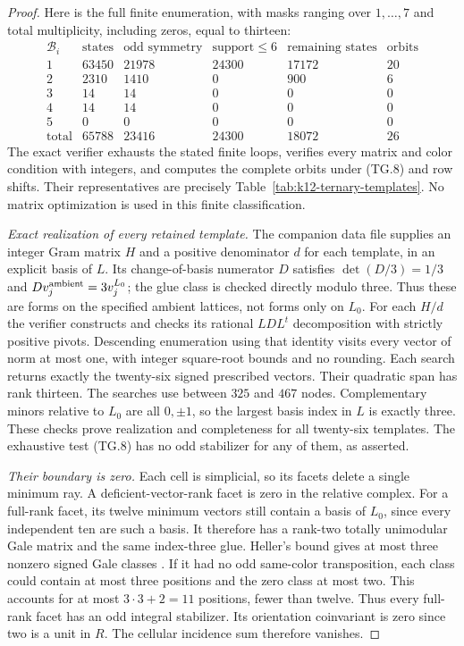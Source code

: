 \begin{proof}
Here is the full finite enumeration, with masks ranging over
$1,\ldots,7$ and total multiplicity, including zeros, equal to thirteen:
\[
\begin{array}{c|r|r|r|r|r}
\mathcal B_i&\text{states}&\text{odd symmetry}&\text{support}\le6
       &\text{remaining states}&\text{orbits}\\\hline
1&63450&21978&24300&17172&20\\
2&2310&1410&0&900&6\\
3&14&14&0&0&0\\
4&14&14&0&0&0\\
5&0&0&0&0&0\\\hline
\text{total}&65788&23416&24300&18072&26
\end{array}                                                     \tag{TG.9}
\]
The exact verifier exhausts the stated finite loops, verifies every
matrix and color condition with integers, and computes the complete
orbits under (TG.8) and row shifts. Their representatives are precisely
Table~\ref{tab:k12-ternary-templates}. No matrix optimization is used
in this finite classification.

\emph{Exact realization of every retained template.}
The companion data file supplies an integer Gram matrix $H$ and a
positive denominator $d$ for each template, in an explicit basis of
$L$. Its change-of-basis numerator $D$ satisfies
$\det(D/3)=1/3$ and $Dv_j^{\rm ambient}=3v_j^{L_0}$; the glue class
is checked directly modulo three. Thus these are forms on the
specified ambient lattices, not forms only on $L_0$.
For each $H/d$ the verifier constructs and checks its rational
$LDL^t$ decomposition with strictly positive pivots. Descending
enumeration using that identity visits every vector of norm at most
one, with integer square-root bounds and no rounding. Each search
returns exactly the twenty-six signed prescribed vectors. Their
quadratic span has rank thirteen. The searches use between $325$
and $467$ nodes. Complementary minors relative to $L_0$ are all
$0,\pm1$, so the largest basis index in $L$ is exactly three.
These checks prove realization and completeness for all twenty-six
templates. The exhaustive test (TG.8) has no odd stabilizer for any
of them, as asserted.

\emph{Their boundary is zero.}
Each cell is simplicial, so its facets delete a single minimum ray.
A deficient-vector-rank facet is zero in the relative complex.
For a full-rank facet, its twelve minimum vectors still contain a
basis of $L_0$, since every independent ten are such a basis.
It therefore has a rank-two totally unimodular Gale matrix and
the same index-three glue. Heller's bound gives at most three
nonzero signed Gale classes
\cite[\S1, the formula $h(1,m)=m^2+m+1$]{AverkovSchymura2024}.
If it had no odd same-color transposition, each class could contain
at most three positions and the zero class at most two. This accounts
for at most $3\cdot3+2=11$ positions, fewer than twelve.
Thus every full-rank facet has an odd integral stabilizer.
Its orientation coinvariant is zero since two is a unit in $R$.
The cellular incidence sum therefore vanishes.


\end{proof}
